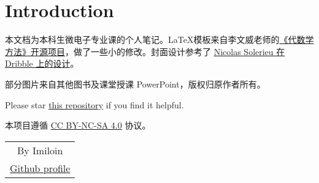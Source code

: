 \chapter*{Introduction}
	本文档为本科生微电子专业课的个人笔记。\LaTeX 模板来自李文威老师的\href{https://github.com/wenweili/AlJabr-1}{《代数学方法》开源项目}，做了一些小的修改。封面设计参考了 \href{https://dribbble.com/shots/21647162-Bento-boxes}{Nicolas Solerieu 在 Dribble 上的设计}。

	部分图片来自其他图书及课堂授课 PowerPoint，版权归原作者所有。

	Please star \href{https://github.com/Imiloin/IntegratedCircuits}{this repository} if you find it helpful.

	本项目遵循 \href{https://creativecommons.org/licenses/by-nc-sa/4.0/}{CC BY-NC-SA 4.0} 协议。
	\vspace{1em}
	\begin{flushright}\begin{minipage}{0.2 \textwidth}
		\begin{tabular}{c}
			{By Imiloin} \\
			\href{https://github.com/Imiloin}{Github profile}\\
		\end{tabular}
	\end{minipage}\end{flushright}
